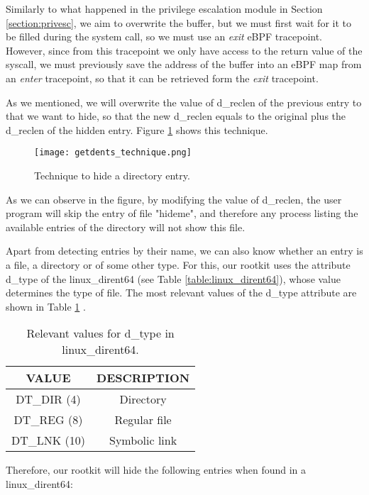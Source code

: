 Similarly to what happened in the privilege escalation module in Section \ref{section:privesc}, we aim to overwrite the buffer, but we must first wait for it to be filled during the system call, so we must use an \textit{exit} eBPF tracepoint. However, since from this tracepoint we only have access to the return value of the syscall, we must previously save the address of the buffer into an eBPF map from an \textit{enter} tracepoint, so that it can be retrieved form the \textit{exit} tracepoint. 

As we mentioned, we will overwrite the value of d\_reclen of the previous entry to that we want to hide, so that the new d\_reclen equals to the original plus the d\_reclen of the hidden entry. Figure \ref{fig:getdents_technique} shows this technique.

\begin{figure}[htbp]
	\centering
	\texttt{[image: getdents\_technique.png]}
	\caption{Technique to hide a directory entry.}
	\label{fig:getdents_technique}
\end{figure}

As we can observe in the figure, by modifying the value of d\_reclen, the user program will skip the entry of file "hideme", and therefore any process listing the available entries of the directory will not show this file.

Apart from detecting entries by their name, we can also know whether an entry is a file, a directory or of some other type. For this, our rootkit uses the attribute d\_type of the linux\_dirent64 (see Table \ref{table:linux_dirent64}), whose value determines the type of file. The most relevant values of the d\_type attribute are shown in Table \ref{table:dtype_values} \cite{dtype_dirent}.

\begin{table}[htbp]
\begin{tabular}{|c|c|}
\hline
\textbf{VALUE} & \textbf{DESCRIPTION} \\
\hline
\hline
DT\_DIR (4) & Directory\\
\hline
DT\_REG (8) & Regular file\\
\hline
DT\_LNK (10) & Symbolic link\\
\hline
\end{tabular}
\caption{Relevant values for d\_type in linux\_dirent64.}
\label{table:dtype_values}
\end{table}

Therefore, our rootkit will hide the following entries when found in a linux\_dirent64:

